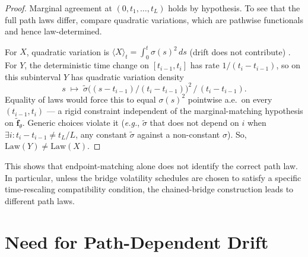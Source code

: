 \documentclass{article}
\begin{document}
\begin{proof}
Marginal agreement at $(0, t_1, \ldots, t_L)$ holds by hypothesis. To see that the full path laws differ, compare quadratic variations, which are pathwise functionals and hence law-determined.

For $X$, quadratic variation is $\langle X \rangle_t = \int_0^t \sigma(s)^2\,ds$ (drift does not contribute) \cite{ito1944109, ito1951stochastic, karatzas2014brownian}. For $Y$, the deterministic time change on $[t_{i-1}, t_i]$ has rate $1/(t_i - t_{i-1})$, so on this subinterval $Y$ has quadratic variation density
\[
  s \;\mapsto\; \tilde{\sigma}\big((s - t_{i-1})/(t_i - t_{i-1})\big)^2 \,/\, (t_i - t_{i-1}).
\]
Equality of laws would force this to equal $\sigma(s)^2$ pointwise a.e.\ on every $(t_{i-1}, t_i)$ --- a rigid constraint independent of the marginal-matching hypothesis on $\tilde{\mathbf{f}}_\theta$. Generic choices violate it (\textit{e.g.}, $\tilde{\sigma}$ that does not depend on $i$ when $\exists i:t_i - t_{i-1} \neq t_L/L$, any constant $\tilde{\sigma}$ against a non-constant $\sigma$). So, $\mathrm{Law}(Y) \neq \mathrm{Law}(X)$.
\end{proof}

This shows that endpoint-matching alone does not identify the correct path law. In particular, unless the bridge volatility schedules are chosen to satisfy a specific time-rescaling compatibility condition, the chained-bridge construction leads to different path laws.


\section{Need for Path-Dependent Drift}
\end{document}
